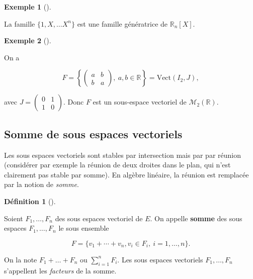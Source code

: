 \documentclass[
  french,
  letterpaper,
  DIV=11,
  numbers=noendperiod]{scrreprt}
\theoremstyle{plain}
\theoremstyle{definition}
\newtheorem{definition}{Définition}[chapter]
\theoremstyle{plain}
\theoremstyle{plain}
\theoremstyle{definition}
\theoremstyle{definition}
\newtheorem{example}{Exemple}[chapter]
\theoremstyle{plain}
\theoremstyle{remark}
\begin{document}
\begin{example}[]\protect\hypertarget{exm-famille-generatrice-1}{}\label{exm-famille-generatrice-1}

La famille \(\{1,X,\dots X^{n}\}\) est une famille génératrice de
\(\mathbb{R}_{n}[X]\).

\end{example}

\begin{example}[]\protect\hypertarget{exm-famille-generatrice-2}{}\label{exm-famille-generatrice-2}

On a

\[
    F=\left\{ \begin{pmatrix}
        a&b\\b&a
    \end{pmatrix},\ a,b \in \mathbb{R}\right\} = \mathrm{Vect}(I_2,J),
\]

avec \(J = \begin{pmatrix} 0&1\\1&0 \end{pmatrix}\). Donc \(F\) est un
sous-espace vectoriel de \(\mathcal{M}_{2}(\mathbb{R})\).

\end{example}

\subsection{Somme de sous espaces
vectoriels}\label{somme-de-sous-espaces-vectoriels}

Les sous espaces vectoriels sont stables par intersection mais par par
réunion (considérer par exemple la réunion de deux droites dans le plan,
qui n'est clairement pas stable par somme). En algèbre linéaire, la
réunion est remplacée par la notion de \emph{somme}.

\begin{definition}[]\protect\hypertarget{def-somme}{}\label{def-somme}

Soient \(F_{1},\dots,F_{n}\) des sous espaces vectoriel de \(E\). On
appelle \textbf{somme} des sous espaces \(F_1,\dots,F_{n}\) le sous
ensemble

\[
    F = \{v_1 + \cdots + v_{n}, v_{i} \in F_{i},\ i=1,\dots,n\}.
\]

On la note \(F_{1}+ \dots + F_{n}\) ou
\(\displaystyle \sum_{i=1}^{n}F_{i}\). Les sous espaces vectoriels
\(F_{1},\dots,F_{n}\) s'appellent les \emph{facteurs} de la somme.

\end{definition}
\end{document}
